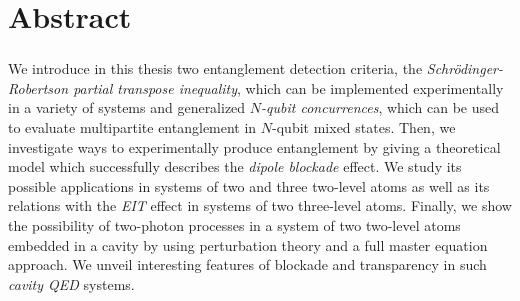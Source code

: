 \chapter*{Abstract}

\subsection*{\thesistitle}

We introduce in this thesis two entanglement detection criteria, the \textit{Schr\"odinger-Robertson partial transpose inequality}, which can be implemented experimentally in a variety of systems and generalized \textit{$N$-qubit concurrences}, which can be used to evaluate multipartite entanglement in $N$-qubit mixed states. Then, we investigate ways to experimentally produce entanglement by giving a theoretical model which successfully describes the \textit{dipole blockade} effect. We study its possible applications in systems of two and three two-level atoms as well as its relations with the \textit{EIT} effect in systems of two three-level atoms. Finally, we show the possibility of two-photon processes in a system of two two-level atoms embedded in a cavity by using perturbation theory and a full master equation approach. We unveil interesting features of blockade and transparency in such \textit{cavity QED} systems.
